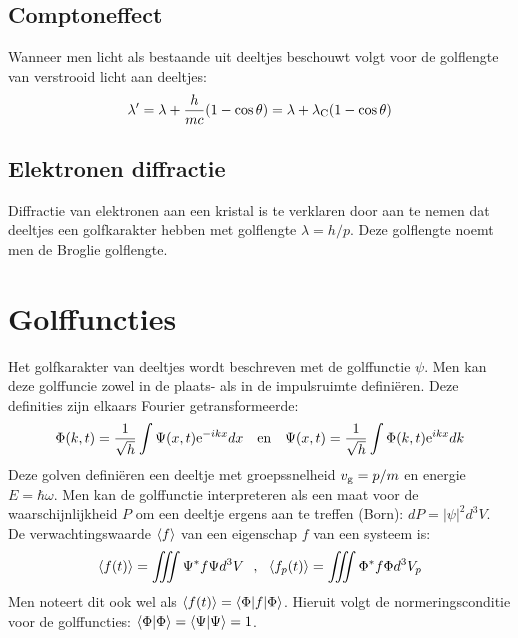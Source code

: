 \documentclass[twoside]{report}
\begin{document}
\subsection{Comptoneffect}
Wanneer men licht als bestaande uit deeltjes beschouwt volgt voor de
golflengte van verstrooid licht aan deeltjes:
\[
\lambda'=\lambda+\frac{h}{mc}(1-\cos\theta)=\lambda+\lambda_{\rm C}(1-\cos\theta)
\]

\subsection{Elektronen diffractie}
Diffractie van elektronen aan een kristal is te verklaren door aan te nemen
dat deeltjes een golfkarakter hebben met golflengte $\lambda=h/p$. Deze
golflengte noemt men de Broglie golflengte.

\section[~~Golffuncties]{Golffuncties}
Het golfkarakter van deeltjes wordt beschreven met de golffunctie $\psi$. Men
kan deze golffuncie zowel in de plaats- als in de impulsruimte defini\"eren.
Deze definities zijn elkaars Fourier getransformeerde:
\[
\Phi(k,t)=\frac{1}{\sqrt{h}}\int\Psi(x,t){\rm e}^{-ikx}dx~~~\mbox{en}~~~
\Psi(x,t)=\frac{1}{\sqrt{h}}\int\Phi(k,t){\rm e}^{ikx}dk
\]
Deze golven defini\"eren een deeltje met groepssnelheid $v_{\rm g}=p/m$ en
energie $E=\hbar\omega$.
\npar
Men kan de golffunctie interpreteren als een maat voor de waarschijnlijkheid
$P$ om een deeltje ergens aan te treffen (Born): $dP=|\psi|^2d^3V$. De
verwachtingswaarde $\left\langle f \right\rangle$ van een eigenschap $f$ van een systeem is:
\[
\av{f(t)}=\iiint\Psi^* f\Psi d^3V~~,~~\av{f_p(t)}=\iiint\Phi^*f\Phi d^3V_p
\]
Men noteert dit ook wel als $\left\langle f(t) \right\rangle=\left\langle \Phi|f|\Phi \right\rangle$. Hieruit volgt de
normeringsconditie voor de golffuncties: $\left\langle \Phi|\Phi \right\rangle=\left\langle \Psi|\Psi \right\rangle=1$.
\end{document}
